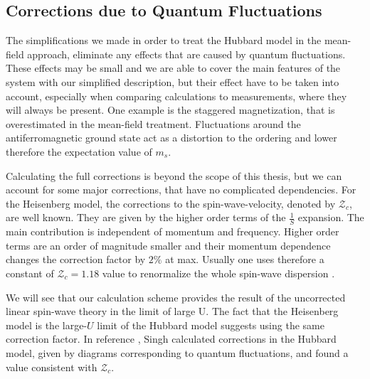 \documentclass[a4paper,12pt]{report}
\begin{document}
\subsection{Corrections due to Quantum Fluctuations}
  
The simplifications we made in order to treat the Hubbard model in the mean-field approach,  
eliminate any effects that are caused by quantum fluctuations.
These effects may be small and we are able to cover the main features of the system with our simplified description,
but their effect have to be taken into account, especially when comparing calculations to measurements, where they will always be present.
One example is the staggered magnetization, that is overestimated in the mean-field treatment. 
Fluctuations around the antiferromagnetic ground state act as a distortion to the ordering and lower therefore the expectation value of $m_s$.


Calculating the full corrections is beyond the scope of this thesis, but we can account for some major corrections, that have no complicated dependencies.
For the Heisenberg model, the corrections to the spin-wave-velocity, denoted by $\mathcal{Z}_c$, are well known.
They are given by the higher order terms of the $\frac1S$ expansion. 
The main contribution is independent of momentum and frequency. 
Higher order terms are an order of magnitude smaller and their momentum dependence changes the correction factor by $2\%$ at max.
Usually one uses therefore a constant of $\mathcal{Z}_c=1.18$ value to renormalize the whole spin-wave dispersion \cite{PhysRevB.45.10131}.

We will see that our calculation scheme provides the result of the uncorrected linear spin-wave theory in the limit of large U. 
The fact that the Heisenberg model is the large-$U$ limit of the Hubbard model suggests using the same correction factor.
In reference \cite{PhysRevB.43.3617}, Singh calculated corrections in the Hubbard model, 
given by diagrams corresponding to quantum fluctuations,
and found a value consistent with $\mathcal{Z}_c$.







 
 
\end{document}
